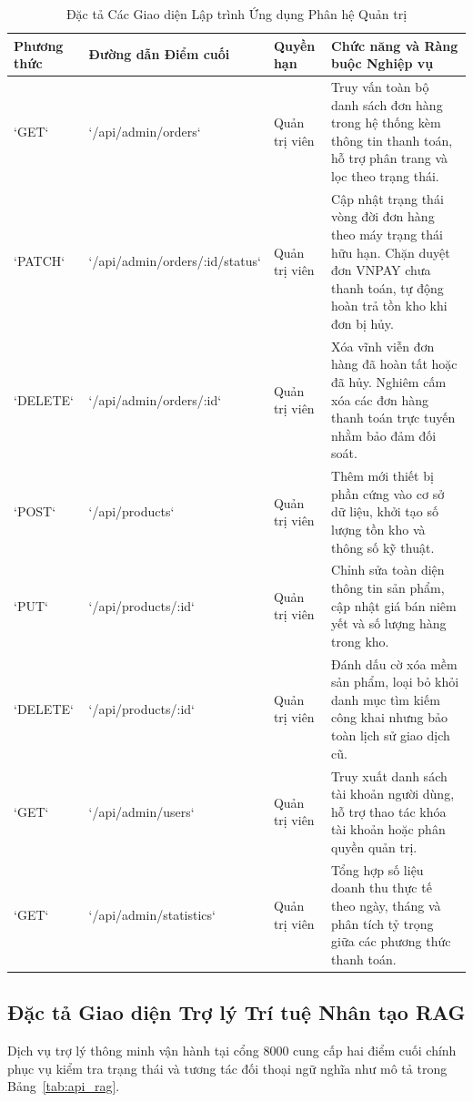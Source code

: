 \begin{table}[H]
\centering
\caption{Đặc tả Các Giao diện Lập trình Ứng dụng Phân hệ Quản trị}
\label{tab:api_admin}
\begin{tabularx}{\textwidth}{p{1.8cm}p{4cm}p{2cm}X}
\toprule
\textbf{Phương thức} & \textbf{Đường dẫn Điểm cuối} & \textbf{Quyền hạn} & \textbf{Chức năng và Ràng buộc Nghiệp vụ} \\
\midrule
`GET` & `/api/admin/orders` & Quản trị viên & Truy vấn toàn bộ danh sách đơn hàng trong hệ thống kèm thông tin thanh toán, hỗ trợ phân trang và lọc theo trạng thái. \\
\addlinespace
`PATCH` & `/api/admin/orders/:id/status` & Quản trị viên & Cập nhật trạng thái vòng đời đơn hàng theo máy trạng thái hữu hạn. Chặn duyệt đơn VNPAY chưa thanh toán, tự động hoàn trả tồn kho khi đơn bị hủy. \\
\addlinespace
`DELETE` & `/api/admin/orders/:id` & Quản trị viên & Xóa vĩnh viễn đơn hàng đã hoàn tất hoặc đã hủy. Nghiêm cấm xóa các đơn hàng thanh toán trực tuyến nhằm bảo đảm đối soát. \\
\addlinespace
`POST` & `/api/products` & Quản trị viên & Thêm mới thiết bị phần cứng vào cơ sở dữ liệu, khởi tạo số lượng tồn kho và thông số kỹ thuật. \\
\addlinespace
`PUT` & `/api/products/:id` & Quản trị viên & Chỉnh sửa toàn diện thông tin sản phẩm, cập nhật giá bán niêm yết và số lượng hàng trong kho. \\
\addlinespace
`DELETE` & `/api/products/:id` & Quản trị viên & Đánh dấu cờ xóa mềm sản phẩm, loại bỏ khỏi danh mục tìm kiếm công khai nhưng bảo toàn lịch sử giao dịch cũ. \\
\addlinespace
`GET` & `/api/admin/users` & Quản trị viên & Truy xuất danh sách tài khoản người dùng, hỗ trợ thao tác khóa tài khoản hoặc phân quyền quản trị. \\
\addlinespace
`GET` & `/api/admin/statistics` & Quản trị viên & Tổng hợp số liệu doanh thu thực tế theo ngày, tháng và phân tích tỷ trọng giữa các phương thức thanh toán. \\
\bottomrule
\end{tabularx}
\end{table}

\subsection{Đặc tả Giao diện Trợ lý Trí tuệ Nhân tạo RAG}
Dịch vụ trợ lý thông minh vận hành tại cổng 8000 cung cấp hai điểm cuối chính phục vụ kiểm tra trạng thái và tương tác đối thoại ngữ nghĩa như mô tả trong Bảng~\ref{tab:api_rag}.


